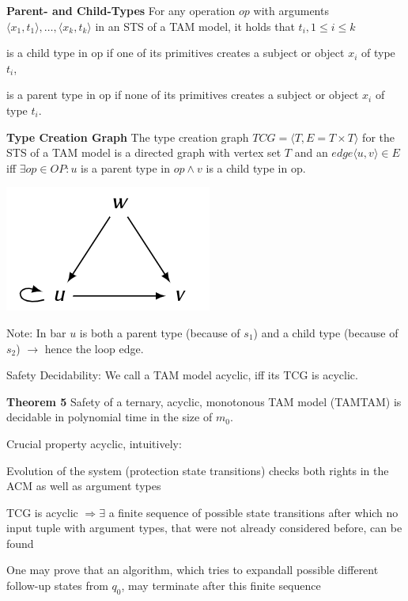 \documentclass[a4paper]{article}
\renewcommand{\note}[2]{\begin{noteBox} \textbf{#1} #2 \end{noteBox}}
\begin{document}
\begin{multicols}{3}
    \note{Parent- and Child-Types}{For any operation $op$ with arguments $\langle x_1,t_1\rangle ,\dots ,\langle x_k,t_k\rangle$ in an STS of a TAM model, it holds that $t_i, 1\leq i\leq k$
        \begin{itemize*}
            \item is a child type in op if one of its primitives creates a subject or object $x_i$ of type $t_i$,
            \item is a parent type in op if none of its primitives creates a subject or object $x_i$ of type $t_i$.
        \end{itemize*}
    }

    \note{Type Creation Graph}{The type creation graph $TCG=\langle T,E=T\times T\rangle$ for the STS of a TAM model is a directed graph with vertex set $T$ and an $edge\langle u,v\rangle \in E$ iff $\exists op\in OP:u$ is a parent type in $op\wedge v$ is a child type in op.}

    \begin{multicols}{2}
        \includegraphics[width=.7\linewidth]{Assets/Systemsicherheit-acyclic-tam-example.png}
        \columnbreak

        Note: In bar $u$ is both a parent type (because of $s_1$) and a child type (because of $s_2$) $\rightarrow$ hence the loop edge.
    \end{multicols}

    Safety Decidability: We call a TAM model acyclic, iff its TCG is acyclic.

    \note{Theorem 5}{Safety of a ternary, acyclic, monotonous TAM model (TAMTAM) is decidable in polynomial time in the size of $m_0$.}

    Crucial property acyclic, intuitively:
    \begin{itemize*}
        \item Evolution of the system (protection state transitions) checks both rights in the ACM as well as argument types
        \item TCG is acyclic $\Rightarrow\exists$ a finite sequence of possible state transitions after which no input tuple with argument types, that were not already considered before, can be found
        \item One may prove that an algorithm, which tries to expandall possible different follow-up states from $q_0$, may terminate after this finite sequence
    \end{itemize*}


\end{multicols}
\end{document}
